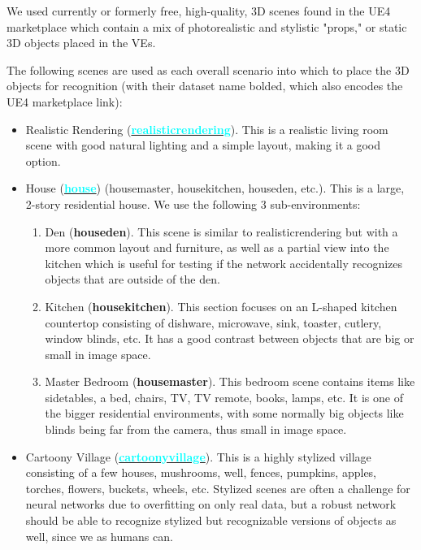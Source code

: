 We used currently or formerly free, high-quality, 3D scenes found in the UE4 marketplace which contain a mix of photorealistic and stylistic "props," or static 3D objects placed in the VEs.

The following scenes are used as each overall scenario into which to place the 3D objects for recognition (with their dataset name bolded, which also encodes the UE4 marketplace link):
\begin{itemize}[noitemsep,leftmargin=*]
    \item Realistic Rendering (\textbf{\href{https://unrealengine.com/learn/realistic-rendering}{\textcolor{cyan}{realisticrendering}}}). This is a realistic living room scene with good natural lighting and a simple layout, making it a good option.
    \item House (\textbf{\href{https://www.unrealengine.com/marketplace/en-US/product/hq-residential-house}{\textcolor{cyan}{house}}}) (housemaster, housekitchen, houseden, etc.). This is a large, 2-story residential house. We use the following 3 sub-environments:
    \begin{enumerate}
        \item Den (\textbf{houseden}). This scene is similar to realisticrendering but with a more common layout and furniture, as well as a partial view into the kitchen which is useful for testing if the network accidentally recognizes objects that are outside of the den.
        \item Kitchen (\textbf{housekitchen}). This section focuses on an L-shaped kitchen countertop consisting of dishware, microwave, sink, toaster, cutlery, window blinds, etc. It has a good contrast between objects that are big or small in image space. 
        \item Master Bedroom (\textbf{housemaster}). This bedroom scene contains items like sidetables, a bed, chairs, TV, TV remote, books, lamps, etc. It is one of the bigger residential environments, with some normally big objects like blinds being far from the camera, thus small in image space.
    \end{enumerate}
    \item Cartoony Village (\textbf{\href{https://www.unrealengine.com/marketplace/en-US/product/advanced-village-pack}{\textcolor{cyan}{cartoonyvillage}}}). This is a highly stylized village consisting of a few houses, mushrooms, well, fences, pumpkins, apples, torches, flowers, buckets, wheels, etc. Stylized scenes are often a challenge for neural networks due to overfitting on only real data, but a robust network should be able to recognize stylized but recognizable versions of objects as well, since we as humans can.

\end{itemize}
